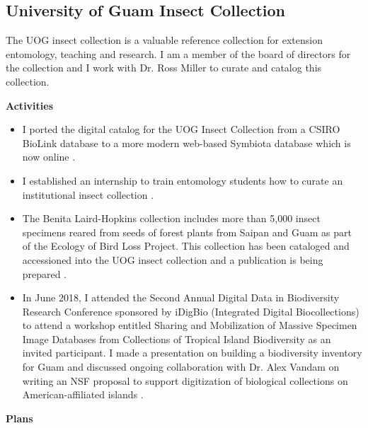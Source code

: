 \documentclass[12pt,english]{scrartcl}
\newcommand{\activities}{\medskip\textbf{Activities}}
\newcommand{\plans}{\medskip\textbf{Plans}}
\begin{document}
\subsection{University of Guam Insect Collection}
\begin{refsection}

The UOG insect collection is a valuable reference collection for extension
entomology, teaching and research. I am a member of the board of directors
for the collection and I work with Dr. Ross Miller to curate and catalog
this collection.

\activities

\begin{itemize}

\item I ported the digital catalog for the UOG Insect Collection from a
CSIRO BioLink database to a more modern web-based Symbiota database
which is now online \cite{moore_scan_2018}.

\item I established an internship to train entomology students how to curate
an institutional insect collection \cite{moore_internship_2018}.

\item The Benita Laird-Hopkins collection includes more than 5,000 insect
specimens reared from seeds of forest plants from Saipan and Guam
as part of the Ecology of Bird Loss Project. This collection has been
cataloged and accessioned into the UOG insect collection and a publication
is being prepared \cite{laird-hopkins_[preparation]_2018}.

\item In June 2018, I attended the Second Annual Digital Data in Biodiversity
Research Conference sponsored by iDigBio (Integrated Digital Biocollections)
to attend a workshop entitled Sharing and Mobilization of Massive
Specimen Image Databases from Collections of Tropical Island Biodiversity
as an invited participant. I made a presentation on building a biodiversity
inventory for Guam \cite{moore_building_2018-1} and discussed ongoing
collaboration with Dr. Alex Vandam on writing an NSF proposal to support
digitization of biological collections on American-affiliated islands
\cite{moore_trip_2018}.
\end{itemize}

\plans

\printbibliography

\end{refsection}
\end{document}
